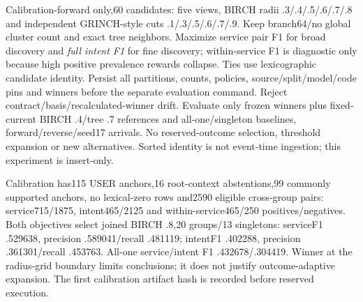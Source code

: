 \documentclass[11pt]{article}
\begin{document}
Calibration-forward only,60 candidates: five views, BIRCH radii
.3/.4/.5/.6/.7/.8 and independent GRINCH-style cuts .1/.3/.5/.6/.7/.9.
Keep branch64/no global cluster count and exact tree neighbors. Maximize service
pair F1 for broad discovery and \emph{full intent F1} for fine discovery;
within-service F1 is diagnostic only because high positive prevalence rewards
collapse. Ties use lexicographic candidate identity. Persist all partitions,
counts, policies, source/split/model/code pins and winners before the separate
evaluation command. Reject contract/basis/recalculated-winner drift. Evaluate
only frozen winners plus fixed-current BIRCH .4/tree .7 references and
all-one/singleton baselines, forward/reverse/seed17 arrivals. No reserved-outcome
selection, threshold expansion or new alternatives. Sorted identity is not
event-time ingestion; this experiment is insert-only.

Calibration has115 USER anchors,16 root-context abstentions,99 commonly supported
anchors, no lexical-zero rows and2590 eligible cross-group pairs: service715/1875,
intent465/2125 and within-service465/250 positives/negatives. Both objectives
select joined BIRCH .8,20 groups/13 singletons: serviceF1 .529638,
precision .589041/recall .481119; intentF1 .402288, precision .361301/recall
.453763. All-one service/intent F1 .432678/.304419. Winner at the radius-grid
boundary limits conclusions; it does not justify outcome-adaptive expansion.
The first calibration artifact hash is recorded before reserved execution.
\end{document}
